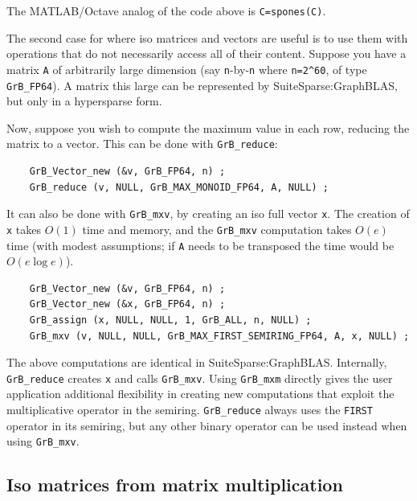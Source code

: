 The MATLAB/Octave analog of the code above is \verb'C=spones(C)'.

The second case for where iso matrices and vectors are useful is to use them
with operations that do not necessarily access all of their content.
Suppose you have a matrix \verb'A' of arbitrarily large dimension (say
\verb'n'-by-\verb'n' where \verb'n=2^60', of type \verb'GrB_FP64').  A matrix
this large can be represented by SuiteSparse:GraphBLAS, but only in a
hypersparse form.

Now, suppose you wish to compute the maximum value in each row, reducing the
matrix to a vector.  This can be done with \verb'GrB_reduce':

{\footnotesize
\begin{verbatim}
    GrB_Vector_new (&v, GrB_FP64, n) ;
    GrB_reduce (v, NULL, GrB_MAX_MONOID_FP64, A, NULL) ; \end{verbatim}}

It can also be done with \verb'GrB_mxv', by creating an iso full vector
\verb'x'.  The creation of \verb'x' takes $O(1)$ time and memory,
and the \verb'GrB_mxv' computation takes $O(e)$ time (with modest assumptions;
if \verb'A' needs to be transposed the time would be $O(e \log e)$).

{\footnotesize
\begin{verbatim}
    GrB_Vector_new (&v, GrB_FP64, n) ;
    GrB_Vector_new (&x, GrB_FP64, n) ;
    GrB_assign (x, NULL, NULL, 1, GrB_ALL, n, NULL) ;
    GrB_mxv (v, NULL, NULL, GrB_MAX_FIRST_SEMIRING_FP64, A, x, NULL) ; \end{verbatim}}

The above computations are identical in SuiteSparse:GraphBLAS.  Internally,
\verb'GrB_reduce' creates \verb'x' and calls \verb'GrB_mxv'.  Using
\verb'GrB_mxm' directly gives the user application additional flexibility in
creating new computations that exploit the multiplicative operator in the
semiring.  \verb'GrB_reduce' always uses the \verb'FIRST' operator in its
semiring, but any other binary operator can be used instead when using
\verb'GrB_mxv'.

\subsection{Iso matrices from matrix multiplication}
\label{iso_mxm}

